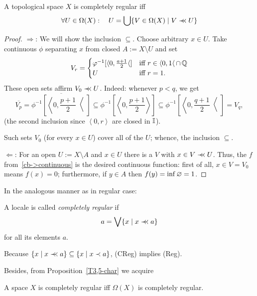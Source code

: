 \begin{prop} \label{T3,5-char}
  A topological space $X$ is completely regular iff
  \[
    \forall U\in \Omega(X): \quad U = \bigcup\{V\in \Omega(X) \mid V \prec\mkern-8mu\prec U\}
  \]
\end{prop}
\begin{proof}
  $\Rightarrow$:
  We will show the inclusion $\subseteq$. 
  Choose arbitrary $x\in U$.
  Take continuous $\phi$ separating $x$ from closed $A := X\setminus U$ and set
  \[
  V_r =
  \begin{cases}
    \varphi^{-1}[\langle 0, \frac{a+1}{2} \langle] &\mbox{iff } r\in \langle 0, 1
    \langle \, \cap \, \mathbb{Q}  \\
    U                                   &\mbox{iff } r = 1.
  \end{cases}
  \]
  These open sets affirm $V_0 \prec\mkern-8mu\prec U$.
  Indeed: 
  whenever $p < q$, we get
  \[
    \overline{V_p}
    = \overline{\phi^{-1}\left[ \left\langle 0, \frac{p+1}{2} \right\langle \right]}
    \subseteq \phi^{-1}\left[ \left\langle 0, \frac{p+1}{2} \right\rangle \right]
    \subseteq \phi^{-1}\left[ \left\langle 0, \frac{q+1}{2} \right\langle \right]
    = V_q,
  \]
  (the second inclusion since $\left\langle 0, r \right\rangle$ are closed in $\mathbb{I}$).

  Such sets $V_0$ (for every $x\in U$) cover all of the $U$; whence, the
  inclusion $\subseteq$.

  $\Leftarrow$:
  For an open $U := X\setminus A$ and $x\in U$ there is a $V$ with $x\in V \prec\mkern-8mu\prec U$.
  Thus, the $f$ from~\ref{cb->continuous} is the desired continuous function:
  first of all, $x\in V = V_0$ means $f(x) = 0$;
  furthermore, if $y\in A$ then $f(y) = \inf \varnothing = 1$.
\end{proof}

In the analogous manner as in regular case:

\begin{framed}
  \begin{df}[CReg]
    A locale is called \emph{completely regular\/} if
    \[
      a = \bigvee \{x \mid x \prec\mkern-8mu\prec a\}
    \]
    for all its elements $a$.
  \end{df}
\end{framed}

\begin{rem}
  Because $\{x \mid x \prec\mkern-8mu\prec a\}\subseteq \{x \mid x \prec a\}$, (CReg) implies (Reg).
\end{rem}

Besides, from Proposition~\ref{T3,5-char} we acquire
\begin{cor}
  A space $X$ is completely regular iff $\Omega(X)$ is completely regular.
\end{cor}
